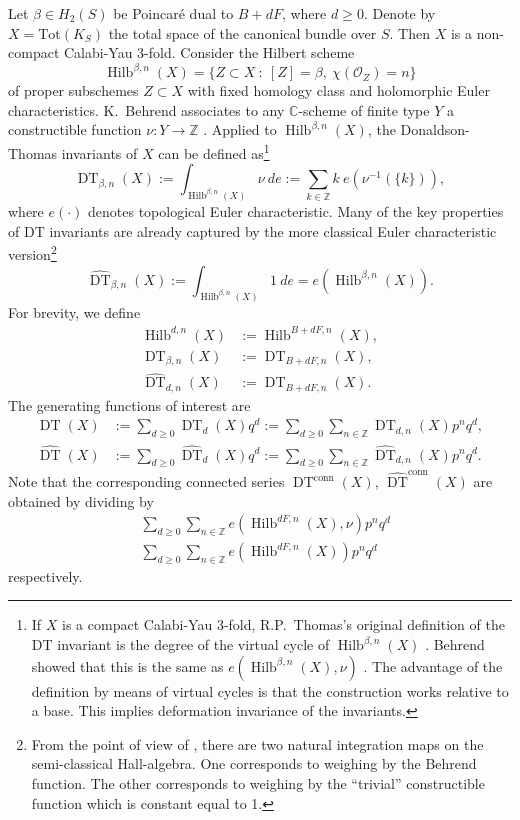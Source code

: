 \documentclass{amsart}
\theoremstyle{definition}
\newcommand{\CC} {\mathbb{C}}          %
\newcommand{\ZZ} {\mathbb{Z}}		%
\renewcommand{\O}{\mathcal{O}}
\newcommand{\Hilb}{\operatorname{Hilb}}
\newcommand{\DT}{\operatorname{DT}}
\newcommand{\conn}{\operatorname{conn}}
\begin{document}
Let $\beta \in H_2(S)$ be Poincar\'e dual to $B+dF$, where $d \geq 0$. Denote by $X = \mathrm{Tot}(K_S)$ the total space of the canonical bundle over $S$. Then $X$ is a non-compact Calabi-Yau 3-fold. Consider the Hilbert scheme
$$
\Hilb^{\beta,n}(X) = \{ Z \subset X \ : \ [Z] = \beta, \ \chi(\O_Z) = n\}
$$
of proper subschemes $Z \subset X$ with fixed homology class and holomorphic Euler characteristics. K.~Behrend associates to any $\CC$-scheme of finite type $Y$ a constructible function $\nu : Y \rightarrow \ZZ$ \cite{Beh}. Applied to $\Hilb^{\beta,n}(X)$, the Donaldson-Thomas invariants of $X$ can be defined as\footnote{If $X$ is a compact Calabi-Yau 3-fold, R.P.~Thomas's original definition of the DT invariant is the degree of the virtual cycle of $\Hilb^{\beta,n}(X)$ \cite{Tho}. Behrend showed that this is the same as $e(\Hilb^{\beta,n}(X),\nu)$ \cite{Beh}. The advantage of the definition by means of virtual cycles is that the construction works relative to a base. This implies deformation invariance of the invariants.} 
$$
\DT_{\beta,n}(X) := \int_{\Hilb^{\beta,n}(X)} \nu \ de := \sum_{k \in \ZZ} k \ e(\nu^{-1}(\{k\})),
$$
where $e(\cdot)$ denotes topological Euler characteristic. Many of the key properties of DT invariants are already captured by the more classical Euler characteristic version\footnote{From the point of view of \cite{JS, Bri}, there are two natural integration maps on the semi-classical Hall-algebra. One corresponds to weighing by the Behrend function. The other corresponds to weighing by the ``trivial'' constructible function which is constant equal to 1.}
$$
\widehat{\DT}_{\beta,n}(X) := \int_{\Hilb^{\beta,n}(X)} 1 \ de = e(\Hilb^{\beta,n}(X)).
$$
For brevity, we define
\begin{align*}
\Hilb^{d,n}(X) &:=\Hilb^{B+dF,n}(X), \\
\DT_{\beta,n}(X) &:= \DT_{B+dF,n}(X), \\
\widehat{\DT}_{d,n}(X) &:= \DT_{B+dF,n}(X).
\end{align*}
The generating functions of interest are
\begin{align*}
\DT(X) &:= \sum_{d \geq 0} \DT_d(X) q^d := \sum_{d \geq 0} \sum_{n \in \ZZ} \DT_{d,n}(X) p^n q^d, \\
\widehat{\DT}(X) &:= \sum_{d \geq 0} \widehat{\DT}_d(X) q^d := \sum_{d \geq 0} \sum_{n \in \ZZ} \widehat{\DT}_{d,n}(X) p^n q^d.
\end{align*}
Note that the corresponding connected series $\DT^{\conn}(X)$, $\widehat{\DT}^{\conn}(X)$ are obtained by dividing by
\begin{align*}
&\sum_{d \geq 0} \sum_{n \in \ZZ} e(\Hilb^{dF,n}(X),\nu) p^n q^d \\
&\sum_{d \geq 0} \sum_{n \in \ZZ} e(\Hilb^{dF,n}(X)) p^n q^d
\end{align*}
respectively.
\end{document}

